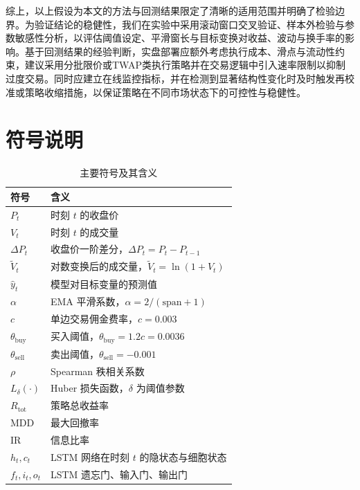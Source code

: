 \documentclass[withoutpreface,bwprint]{cumcmthesis}
\begin{document}
综上，以上假设为本文的方法与回测结果限定了清晰的适用范围并明确了检验边界。为验证结论的稳健性，我们在实验中采用滚动窗口交叉验证、样本外检验与参数敏感性分析，以评估阈值设定、平滑窗长与目标变换对收益、波动与换手率的影响。基于回测结果的经验判断，实盘部署应额外考虑执行成本、滑点与流动性约束，建议采用分批限价或TWAP类执行策略并在交易逻辑中引入速率限制以抑制过度交易。同时应建立在线监控指标，并在检测到显著结构性变化时及时触发再校准或策略收缩措施，以保证策略在不同市场状态下的可控性与稳健性。

\newpage
\section{符号说明}

\begin{table}[!h]
    \centering
    \caption{主要符号及其含义}
    \label{tab:symbols}
    \begin{tabular}{p{3cm}<{\centering}p{11cm}<{\centering}}
    \toprule[1.5pt]
    符号 & 含义\\
    \midrule[1pt]
    $P_t$ & 时刻 $t$ 的收盘价\\
    $V_t$ & 时刻 $t$ 的成交量\\
    $\Delta P_t$ & 收盘价一阶差分，$\Delta P_t = P_t - P_{t-1}$\\
    $\widetilde{V}_t$ & 对数变换后的成交量，$\widetilde{V}_t = \ln(1+V_t)$\\
    $\hat{y}_t$ & 模型对目标变量的预测值\\
    $\alpha$ & EMA 平滑系数，$\alpha = 2/(\text{span}+1)$\\
    $c$ & 单边交易佣金费率，$c = 0.003$\\
    $\theta_{\text{buy}}$ & 买入阈值，$\theta_{\text{buy}} = 1.2c = 0.0036$\\
    $\theta_{\text{sell}}$ & 卖出阈值，$\theta_{\text{sell}} = -0.001$\\
    $\rho$ & Spearman 秩相关系数\\
    $L_\delta(\cdot)$ & Huber 损失函数，$\delta$ 为阈值参数\\
    $R_{\text{tot}}$ & 策略总收益率\\
    $\text{MDD}$ & 最大回撤率\\
    $\text{IR}$ & 信息比率\\
    $h_t, c_t$ & LSTM 网络在时刻 $t$ 的隐状态与细胞状态\\
    $f_t, i_t, o_t$ & LSTM 遗忘门、输入门、输出门\\

\end{tabular}
\end{table}
\end{document}
